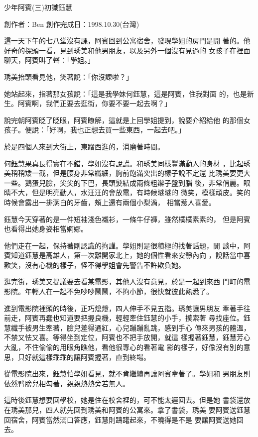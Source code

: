 



少年阿賓(三)初識鈺慧

創作者：Ben
創作完成日：1998.10.30(台灣)


這一天下午的七八堂沒有課，阿賓回到公寓宿舍，發現學姐的房門是開
著的。他好奇的探頭一看，見到琇美和他男朋友，以及另外一個沒有見過的
女孩子在裡面聊天，阿賓叫了聲：「學姐。」

琇美抬頭看見他，笑著說：「你沒課啦？」

她站起來，指著那女孩說：「這是我學妹何鈺慧，這是阿賓，住我對面
的，也是新生。阿賓啊，我們正要去逛街，你要不要一起去啊？」

說完朝阿賓眨了眨眼，阿賓瞭解，這就是上回學姐提到，說要介紹給他
的那個女孩子。便說：「好啊，我也正想去買一些東西，一起去吧。」

於是四個人來到大街上，東蹭西逛的，消磨著時間。

何鈺慧果真長得實在不錯，學姐沒有說謊。和琇美同樣豐滿動人的身材
，比起琇美稍稍矮一截，但是腰身非常纖細，胸前飽滿突出的樣子說不定還
比琇美要更大一些。鵝蛋兒臉，尖尖的下巴，長頭髮結成兩條粗辮子盤到腦
後，非常俏麗。眼睛不大，但是明亮動人，水汪汪的會放電，有時候瞇瞇的
微笑，模樣頑皮。笑的時候會露出一排潔白的牙齒，頰上還有兩個小梨渦，
相當惹人喜愛。

鈺慧今天穿著的是一件短袖淺色襯衫，一條牛仔褲，雖然樸樸素素的，
但是阿賓也看得出她身姿相當婀娜。

他們走在一起，保持著剛認識的拘謹。學姐則是很積極的找著話題，閒
談中，阿賓知道鈺慧是高雄人，第一次離開家北上，她的個性看來安靜內向
，說話當中喜歡笑，沒有心機的樣子，怪不得學姐會先警告不許欺負她。

逛完街，琇美又提議要去看某電影，其他人沒有意見，於是一起到來西
門町的電影院。年輕人在一起不免吵吵鬧鬧，不拘小節，很快就彼此熟悉了。

進到電影院裡頭的時後，正巧熄燈，四人伸手不見五指。琇美讓男朋友
牽著手往前走，阿賓再蠢也知道要把握良機，輕輕牽住鈺慧的小手，摸索著
尋找座位。鈺慧纖手被男生牽著，臉兒羞得通紅，心兒蹦蹦亂跳，感到手心
傳來男孩的體溫，不禁又怯又喜。等得坐到定位，阿賓也不把手放開，就這
樣握著鈺慧，鈺慧芳心大亂，不住偷偷的用眼角瞧他，看他很專心的看著電
影的樣子，好像沒有別的意思，只好就這樣乖乖的讓阿賓握著，直到終場。

從電影院出來，鈺慧怕學姐看見，就不肯繼續再讓阿賓牽著了。學姐和
男朋友則依然臂膀兒相勾著，親親熱熱旁若無人。

這時後鈺慧想要回學校，她是住在校舍裡的，可不能太遲回去。但是她
書袋還放在琇美那兒，四人就先回到琇美和阿賓的公寓來。拿了書袋，琇美
要阿賓送鈺慧回宿舍，阿賓當然滿口答應，鈺慧則躊躇起來，不曉得是不是
要讓阿賓送她回去。


